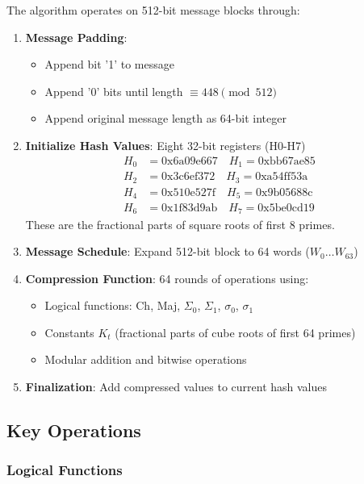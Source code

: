 \documentclass[11pt,a4paper]{article}
\begin{document}
The algorithm operates on 512-bit message blocks through:

\begin{enumerate}
  \item \textbf{Message Padding}:
  \begin{itemize}
    \item Append bit '1' to message
    \item Append '0' bits until length $\equiv 448 \pmod{512}$
    \item Append original message length as 64-bit integer
  \end{itemize}

  \item \textbf{Initialize Hash Values}: Eight 32-bit registers (H0-H7)
  \[
  \begin{aligned}
  H_0 &= \text{0x6a09e667} \quad H_1 = \text{0xbb67ae85} \\
  H_2 &= \text{0x3c6ef372} \quad H_3 = \text{0xa54ff53a} \\
  H_4 &= \text{0x510e527f} \quad H_5 = \text{0x9b05688c} \\
  H_6 &= \text{0x1f83d9ab} \quad H_7 = \text{0x5be0cd19}
  \end{aligned}
  \]
  These are the fractional parts of square roots of first 8 primes.

  \item \textbf{Message Schedule}: Expand 512-bit block to 64 words ($W_0 \ldots W_{63}$)

  \item \textbf{Compression Function}: 64 rounds of operations using:
  \begin{itemize}
    \item Logical functions: Ch, Maj, $\Sigma_0$, $\Sigma_1$, $\sigma_0$, $\sigma_1$
    \item Constants $K_t$ (fractional parts of cube roots of first 64 primes)
    \item Modular addition and bitwise operations
  \end{itemize}

  \item \textbf{Finalization}: Add compressed values to current hash values
\end{enumerate}

\subsection{Key Operations}

\subsubsection{Logical Functions}
\end{document}
